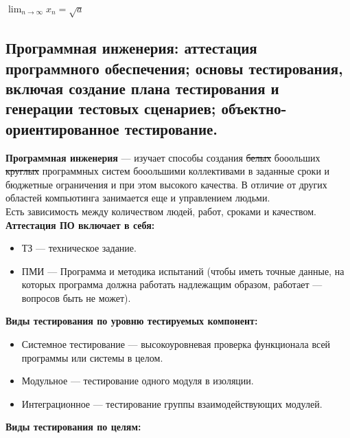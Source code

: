 \documentclass[12pt, a4paper]{article}
\begin{document}
$\lim _{{n\rightarrow \infty }}x_{n}={\sqrt  {a}}$

\subsection{Программная инженерия: аттестация программного обеспечения; основы тестирования, включая создание плана тестирования и генерации тестовых сценариев; объектно-ориентированное тестирование.}

\textbf{Программная инженерия} --- изучает способы создания \sout{белых} бооольших \sout{круглых} программных систем бооольшими коллективами в заданные сроки и бюджетные ограничения и при этом высокого качества. В отличие от других областей компьютинга занимается еще и управлением людьми.\\

Есть зависимость между количеством людей, работ, сроками и качеством.\\ 

\textbf{Аттестация ПО включает в себя: }

\begin{itemize}
    \item ТЗ --- техническое задание.
    \item ПМИ --- Программа и методика испытаний (чтобы иметь точные данные, на которых программа должна работать надлежащим образом, работает --- вопросов быть не может).
\end{itemize}

\textbf{Виды тестирования по уровню тестируемых компонент: }

\begin{itemize}
    \item Системное тестирование --- высокоуровневая проверка функционала всей программы или системы в целом.
    \item Модульное --- тестирование одного модуля в изоляции.
    \item Интеграционное --- тестирование группы взаимодействующих модулей.
\end{itemize}

\textbf{Виды тестирования по целям: }
\end{document}
